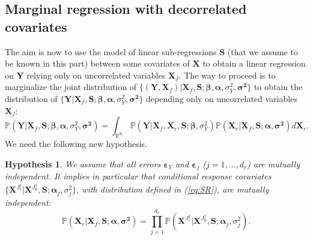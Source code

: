 \documentclass[11pt,a4paper]{article}
\newtheorem{hyp}{Hypothesis}
\begin{document}
\subsection{Marginal regression with decorrelated covariates}
The aim is now to use the model of linear sub-regressions $\boldsymbol{S}$ (that we assume to be known in this part) between some covariates of $\boldsymbol{X}$ to obtain a linear regression on $\boldsymbol{Y}$ relying only on uncorrelated variables $\boldsymbol{X}_f$.  The way to proceed is to marginalize the joint distribution of $\{(\boldsymbol{Y},\boldsymbol{X}_f) |\boldsymbol{X}_f,\boldsymbol{S};\boldsymbol{\beta},\boldsymbol{\alpha},\sigma_Y^2,\boldsymbol{\sigma^2}\}$ to obtain the distribution of $\{\boldsymbol{Y} |\boldsymbol{X}_f,\boldsymbol{S};\boldsymbol{\beta},\boldsymbol{\alpha},\sigma_Y^2,\boldsymbol{\sigma^2}\}$ depending only on uncorrelated variables $\boldsymbol{X}_f$:
\begin{equation}\label{eq:marginal}
\mathbb{P}(\boldsymbol{Y} |\boldsymbol{X}_f,\boldsymbol{S};\boldsymbol{\beta},\boldsymbol{\alpha},\sigma_Y^2,\boldsymbol{\sigma^2}) = \int_{{\mathbb{R}^{d_r}}}\mathbb{P}(\boldsymbol{Y}| \boldsymbol{X}_f,\boldsymbol{X}_r,\boldsymbol{S};\boldsymbol{\beta},\sigma_Y^2) \mathbb{P}(\boldsymbol{X}_r | \boldsymbol{X}_f,\boldsymbol{S};\boldsymbol{\alpha},\boldsymbol{\sigma^2}) d\boldsymbol{X}_r.
\end{equation}
We need the following new hypothesis.

\begin{hyp}\label{H3}
We assume that all errors $\boldsymbol{\varepsilon}_Y$ and $\boldsymbol{\varepsilon}_j$ ($j=1,\ldots,d_r$) are {\it mutually independent}. It implies in particular that conditional response covariates $\{\boldsymbol{X}^{J_{r}^j}|\boldsymbol{X}^{J_{p}^j},\boldsymbol{S};\boldsymbol{\alpha}_j,\sigma^2_j\}$, with distribution defined in (\ref{eq:SR}), are {\it mutually independent}:
\begin{equation}\label{eq:H3}
\mathbb{P}(\boldsymbol{X}_r | \boldsymbol{X}_f,\boldsymbol{S};\boldsymbol{\alpha},\boldsymbol{\sigma^2}) = \prod_{j=1}^{d_r} \mathbb{P}(\boldsymbol{X}^{J_{r}^j}|\boldsymbol{X}^{J_{p}^j},\boldsymbol{S};\boldsymbol{\alpha}_j,\sigma^2_j).
\end{equation}
\end{hyp}

\vspace{3mm}
\end{document}
